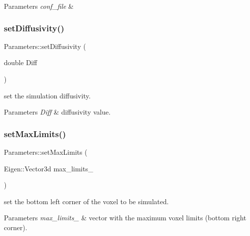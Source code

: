 \begin{DoxyParams}{Parameters}
{\em conf\+\_\+file} & \\
\hline
\end{DoxyParams}
\mbox{\label{class_parameters_a7af2bd289f8c8de738d643bb8e05ac62}} 
\subsubsection{\texorpdfstring{set\+Diffusivity()}{setDiffusivity()}}
{\footnotesize\ttfamily Parameters\+::set\+Diffusivity (\begin{DoxyParamCaption}\item[{double}]{Diff }\end{DoxyParamCaption})}



set the simulation diffusivity. 


\begin{DoxyParams}{Parameters}
{\em Diff} & diffusivity value. \\
\hline
\end{DoxyParams}
\mbox{\label{class_parameters_a96764612c6ee5aeb684e1348e47b2308}} 
\subsubsection{\texorpdfstring{set\+Max\+Limits()}{setMaxLimits()}}
{\footnotesize\ttfamily Parameters\+::set\+Max\+Limits (\begin{DoxyParamCaption}\item[{Eigen\+::\+Vector3d}]{max\+\_\+limits\+\_\+ }\end{DoxyParamCaption})}



set the bottom left corner of the voxel to be simulated. 


\begin{DoxyParams}{Parameters}
{\em max\+\_\+limits\+\_\+} & vector with the maximum voxel limits (bottom right corner). \\
\hline
\end{DoxyParams}
\mbox{\label{class_parameters_a73a4f685a35f8f7012609effb30a17d8}} 
